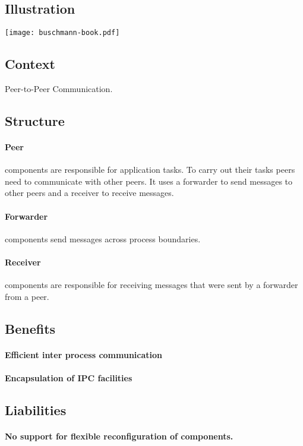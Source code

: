 \documentclass[a4paper,11pt,twocolumn]{report}
\begin{document}
    \subsection{Illustration}
    \texttt{[image: buschmann-book.pdf]}
    \subsection{Context}
    Peer-to-Peer Communication.
    \subsection{Structure}
    \paragraph{Peer} components are responsible for application tasks. To carry
    out their tasks peers need to communicate with other peers. It uses a
    forwarder to send messages to other peers and a receiver to receive
    messages.
    \paragraph{Forwarder} components send messages across process boundaries.
    \paragraph{Receiver} components are responsible for receiving messages that
    were sent by a forwarder from a peer.
    \subsection{Benefits}
    \paragraph{Efficient inter process communication}
    \paragraph{Encapsulation of IPC facilities}
    \subsection{Liabilities}
    \paragraph{No support for flexible reconfiguration of components.}
\end{document}
